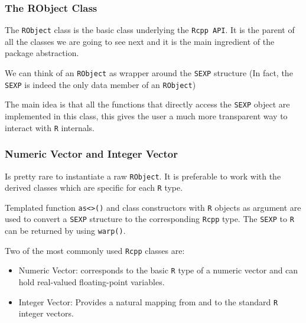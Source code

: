 \documentclass{beamer}
\def\code#1{\texttt{#1}} %
\begin{document}

\begin{frame}

\frametitle{The RObject Class}

The \code{RObject} class is the basic class underlying the \code{Rcpp API}. It is the parent of all the classes we are going to see next and it is the main ingredient of the package abstraction. \pause

\bigskip

We can think of an \code{RObject} as wrapper around the \code{SEXP} structure (In fact, the \code{SEXP} is indeed the only data member of an \code{RObject})  \pause

\bigskip

The main idea is that all the functions that directly access the \code{SEXP} object are implemented in this class, this gives the user a much more transparent way to interact with \code{R} internals.

\end{frame}

	
\begin{frame}
	
\frametitle{Numeric Vector and Integer Vector}	

Is pretty rare to instantiate a raw \code{RObject}. It is preferable to work with the derived classes which are specific for each \code{R} type. \pause

\bigskip

Templated function \code{as<>()} and class constructors with \code{R} objects as argument are used to convert a \code{SEXP} structure to the corresponding \code{Rcpp} type. The \code{SEXP} to \code{R} can be returned by using \code{warp()}. \pause

\bigskip

Two of the most commonly used \code{Rcpp} classes are:

\begin{itemize}
	\item \alert{Numeric Vector}: corresponds to the basic \code{R} type of a numeric vector and can hold real-valued floating-point variables. \pause
	\item \alert{Integer Vector}: Provides a natural mapping from and to the standard \code{R} integer vectors.
\end{itemize}

\end{frame}
\end{document}
